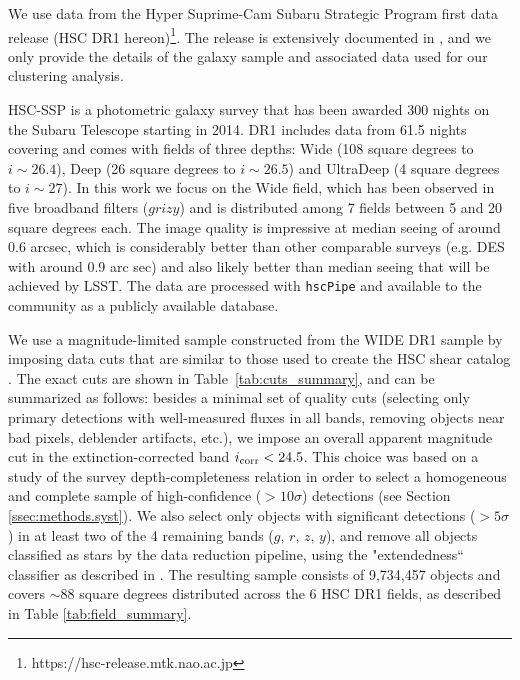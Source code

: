 \documentclass[a4paper,11pt]{article}
\begin{document}
  We use data from the Hyper Suprime-Cam Subaru Strategic Program first data release (HSC DR1 hereon)\footnote{https://hsc-release.mtk.nao.ac.jp}. The release is extensively documented in \cite{2018PASJ...70S...8A}, and we only provide the details of the galaxy sample and associated data used for our clustering analysis.

  HSC-SSP is a photometric galaxy survey that has been awarded 300 nights on the Subaru Telescope starting in 2014. DR1 includes data from 61.5 nights covering and comes with fields of three depths: Wide (108 square degrees to $i\sim 26.4$), Deep (26 square degrees to $i\sim26.5$) and UltraDeep (4 square degrees to $i\sim 27$). In this work we focus on the Wide field, which has been observed in five broadband filters ($grizy$) and is distributed among 7 fields between 5 and 20 square degrees each. The image quality is impressive at median seeing of around 0.6 arcsec, which is considerably better than other comparable surveys (e.g. DES with around 0.9 arc sec) and also likely better than median seeing that will be achieved by LSST. The data are processed with \texttt{hscPipe} \cite{2018PASJ...70S...5B} and  available to the community as a publicly available database.

  
  We use a magnitude-limited sample constructed from the WIDE DR1 sample by imposing data cuts that are similar to those used to create the HSC shear catalog \cite{2018PASJ...70S..25M}. The exact cuts are shown in Table~\ref{tab:cuts_summary}, and can be summarized as follows: besides a minimal set of quality cuts (selecting only primary detections with well-measured fluxes in all bands, removing objects near bad pixels, deblender artifacts, etc.), we impose an overall apparent magnitude cut in the extinction-corrected band $i_{\rm corr}<24.5$. This choice was based on a study of the survey depth-completeness relation in order to select a homogeneous and complete sample of high-confidence ($>10\sigma$) detections (see Section \ref{ssec:methods.syst}). We also select only objects with significant detections ($>5\sigma$) in at least two of the 4 remaining bands ($g,\,r,\,z,\,y$), and remove all objects classified as stars by the data reduction pipeline, using the "extendedness`` classifier as described in \cite{2018PASJ...70S..25M,2018PASJ...70S...5B}. The resulting sample consists of 9,734,457 objects and covers $\sim88$ square degrees distributed across the 6 HSC DR1 fields, as described in Table \ref{tab:field_summary}.
\end{document}
